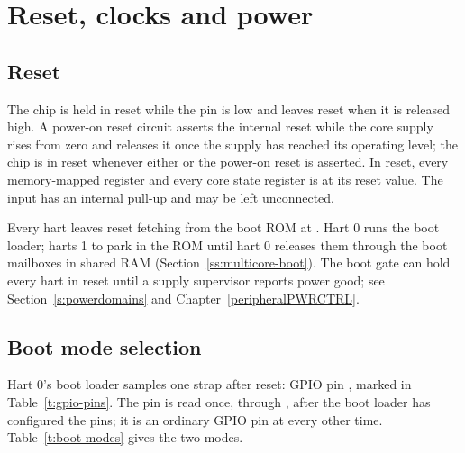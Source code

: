\documentclass[11pt,pdftex,openany,letterpaper]{report}
\begin{document}

\clearpage



\chapter{Reset, clocks and power} \label{s:startup}

\section{Reset}

The chip is held in reset while the  pin is low and leaves reset when it is released high. A power-on reset circuit asserts the internal reset while the core supply rises from zero and releases it once the supply has reached its operating level; the chip is in reset whenever either  or the power-on reset is asserted. In reset, every memory-mapped register and every core state register is at its reset value. The  input has an internal pull-up and may be left unconnected.

Every hart leaves reset fetching from the boot ROM at \texttt{\RomStartAddress}. Hart 0 runs the boot loader; harts 1 to \MaxHartIndex{} park in the ROM until hart 0 releases them through the boot mailboxes in shared RAM (Section~\ref{ss:multicore-boot}). The  boot gate can hold every hart in reset until a supply supervisor reports power good; see Section~\ref{s:powerdomains} and Chapter~\ref{peripheralPWRCTRL}.

\section{Boot mode selection} \label{ss:bootmode}

Hart 0's boot loader samples one strap after reset: GPIO pin , marked  in Table~\ref{t:gpio-pins}. The pin is read once, through , after the boot loader has configured the  pins; it is an ordinary GPIO pin at every other time. Table~\ref{t:boot-modes} gives the two modes.
\end{document}
